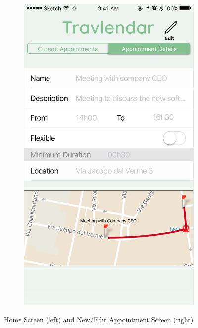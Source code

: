 \documentclass[12pt]{article}
\begin{document}
\begin{figure}[H]
\begin{subfigure}{.4\textwidth}
        \includegraphics[scale=0.47]{interfaceAppointment.png}
        \label{fig:appointmentScreen}
    \end{subfigure}
    \caption{Home Screen (left) and New/Edit Appointment Screen (right)}
\end{figure}
\end{document}
